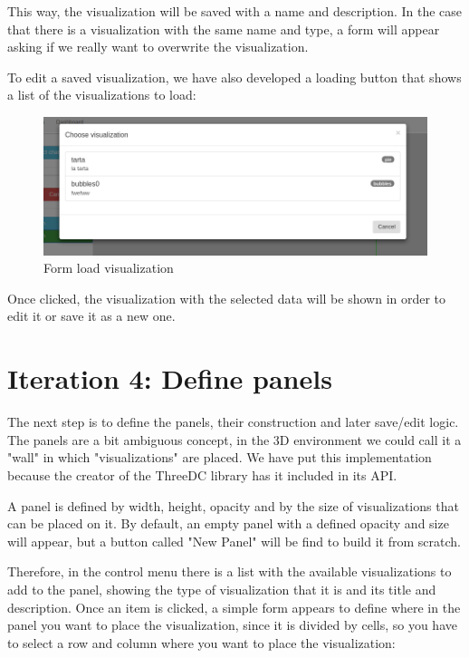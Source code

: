 \documentclass[a4paper, 12pt]{book}
\begin{document}
This way, the visualization will be saved with a name and description. In the case that there is a visualization with the same name and type, a form will appear asking if we really want to overwrite the visualization.

To edit a saved visualization, we have also developed a loading button that shows a list of the visualizations to load:

\begin{figure}[H]
  \centering
  \includegraphics[width=16cm, keepaspectratio]{img/development/exampleload}
  \caption{Form load visualization}
  \label{fig:exampleload}
\end{figure}

Once clicked, the visualization with the selected data will be shown in order to edit it or save it as a new one.

\section{Iteration 4: Define panels}

The next step is to define the panels, their construction and later save/edit logic. The panels are a bit ambiguous concept, in the 3D environment we could call it a "wall" in which "visualizations" are placed. We have put this implementation because the creator of the ThreeDC library has it included in its API.

A panel is defined by width, height, opacity and by the size of visualizations that can be placed on it. By default, an empty panel with a defined opacity and size will appear, but a button called "New Panel" will be find to build it from scratch.

Therefore, in the control menu there is a list with the available visualizations to add to the panel, showing the type of visualization that it is and its title and description. Once an item is clicked, a simple form appears to define where in the panel you want to place the visualization, since it is divided by cells, so you have to select a row and column where you want to place the visualization:
\end{document}
